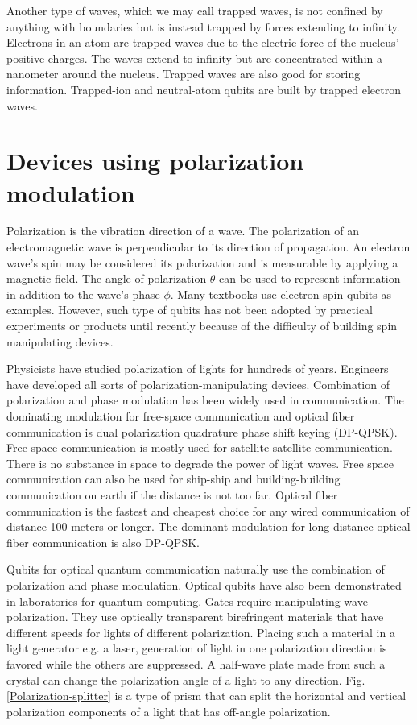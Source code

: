\documentclass[oneside, letter, 12pt]{book}
\begin{document}
Another type of waves, which we may call trapped waves, is not confined by anything with boundaries but is instead trapped by forces extending to infinity. Electrons in an atom are trapped waves due to the electric force of the nucleus' positive charges. The waves extend to infinity but are concentrated within a nanometer around the nucleus. Trapped waves are also good for storing information. Trapped-ion and neutral-atom qubits are built by trapped electron waves.

\section{Devices using polarization modulation}
Polarization is the vibration direction of a wave. The polarization of an electromagnetic wave is perpendicular to its direction of propagation. An electron wave's spin may be considered its polarization and is measurable by applying a magnetic field. The angle of polarization $\theta$ can be used to represent information in addition to the wave's phase $\phi$. Many textbooks use electron spin qubits as examples. However, such type of qubits has not been adopted by practical experiments or products until recently\cite{nanotube} because of the difficulty of building spin manipulating devices.

Physicists have studied polarization of lights for hundreds of years. Engineers have developed all sorts of polarization-manipulating devices. Combination of polarization and phase modulation has been widely used in communication. The dominating modulation for free-space communication and optical fiber communication is dual polarization quadrature phase shift keying (DP-QPSK). Free space communication is mostly used for satellite-satellite communication. There is no substance in space to degrade the power of light waves. Free space communication can also be used for ship-ship and building-building communication on earth if the distance is not too far. Optical fiber communication is the fastest and cheapest choice for any wired communication of distance 100 meters or longer. The dominant modulation for long-distance optical fiber communication is also DP-QPSK.

Qubits for optical quantum communication naturally use the combination of polarization and phase modulation. Optical qubits have also been demonstrated in laboratories for quantum computing. Gates require manipulating wave polarization. They use optically transparent birefringent materials that have different speeds for lights of different polarization. Placing such a material in a light generator e.g. a laser, generation of light in one polarization direction is favored while the others are suppressed. A half-wave plate made from such a crystal can change the polarization angle of a light to any direction. Fig. \ref{Polarization-splitter} is a type of prism that can split the horizontal and vertical polarization components of a light that has off-angle polarization.
\end{document}
